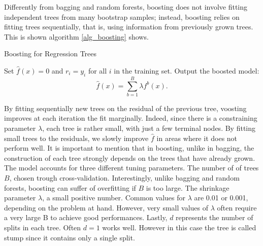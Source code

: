 \documentclass[a4paper,11pt]{article}
\begin{document}
Differently from bagging and random forests, boosting does not involve fitting independent trees from many bootstrap samples; instead, boosting relies on fitting trees sequentially, that is, using information from previously grown trees. 
This is shown algorithm \ref{alg_boosting} shows. 
\begin{algorithm} [h]
  \caption{Boosting for Regression Trees}
  \label{alg_boosting}
  \SetAlgoLined
  \DontPrintSemicolon
  
  Set $\hat{f}(x) = 0$ and $r_i = y_i$ for all $i$ in the training set.\;
  Output the boosted model:
  \begin{equation}
  \hat{f}(x) = \sum_{b=1}^B \lambda f^b(x).
  \end{equation}\;
  
\end{algorithm}

By fitting sequentially new trees on the residual of the previous tree, voosting improves at each iteration the fit marginally. Indeed, since there is a constraining parameter $\lambda$, each tree is rather small, with just a few terminal nodes. By 
fitting small trees to the residuals, we slowly improve $\hat{f}$ in areas where it
does not perform well. It is important to mention that in boosting, unlike in bagging, the construction of each tree strongly depends on the trees that have already grown.
The model accounts for three different tuning parameters. The number of of trees $B$, chosen trough cross-validation.  Interestingly, unlike bagging and random forests, boosting can suffer of overfitting if $B$ is too large.
The shrinkage parameter $\lambda$, a small positive number. Common values for $\lambda$ are 0.01 or 0.001, depending on the problem at hand. However, very small values of $\lambda$ often require a very large B to achieve good performances. Lastly, $d$ represents the number of splits in each tree. Often $d=1$ works well. However in this case the tree is called stump since it contains only a single split.
\end{document}
